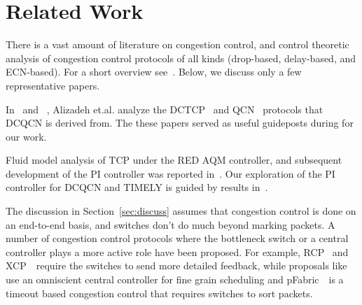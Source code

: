 \section{Related Work}
\label{sec:related}

There is a vast amount of literature on congestion control, and control
theoretic analysis of congestion control protocols of all kinds (drop-based,
delay-based, and ECN-based). For a short overview see~\cite{srikantbook}. Below,
we discuss only a few representative papers.

In~\cite{dctcp-analysis} and ~\cite{qcn-analysis}, Alizadeh et.al. analyze the
DCTCP~\cite{dctcp} and QCN~\cite{qcn} protocols that DCQCN is derived from. The
these papers served as useful guideposts during for our work.

Fluid model analysis of TCP under the RED AQM controller, and subsequent
development of the PI controller was reported
in~\cite{misra2000fluid,hollot2001designing}. Our exploration of the PI
controller for DCQCN and TIMELY is guided by results
in~\cite{hollot2001designing}.

The discussion in Section~\ref{sec:discuss} assumes that congestion control is
done on an end-to-end basis, and switches don't do much beyond marking packets.
A number of congestion control protocols where the bottleneck switch or a
central controller plays a more active role have been proposed. For example,
RCP~\cite{dukkipati2006rcp} and XCP~\cite{katabi2002congestion}~require the switches to send more detailed
feedback, while proposals like~\cite{vattikonda2012practical,wilson2011better}
use an omniscient central controller for fine grain scheduling and pFabric~\cite{pfabric}~is a timeout based congestion control that requires switches to sort packets. 



